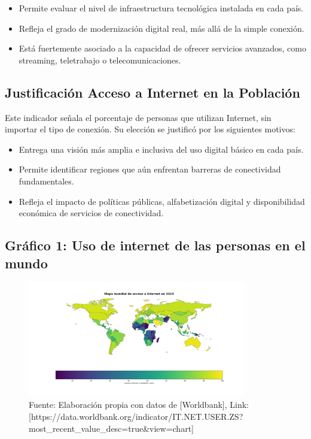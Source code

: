 \documentclass[12pt, a4paper]{article}
\begin{document}
\begin{itemize}
    \item Permite evaluar el nivel de infraestructura tecnológica instalada en cada país.
    \item Refleja el grado de modernización digital real, más allá de la simple conexión.
    \item Está fuertemente asociado a la capacidad de ofrecer servicios avanzados, como streaming, teletrabajo o telecomunicaciones.
\end{itemize}

\subsection{Justificación Acceso a Internet en la Población}

Este indicador señala el porcentaje de personas que utilizan Internet, sin importar el tipo de conexión. Su elección se justificó por los siguientes motivos:

\begin{itemize}
    \item Entrega una visión más amplia e inclusiva del uso digital básico en cada país.
    \item Permite identificar regiones que aún enfrentan barreras de conectividad fundamentales.
    \item Refleja el impacto de políticas públicas, alfabetización digital y disponibilidad económica de servicios de conectividad.
\end{itemize}

\subsection*{Gráfico 1: Uso de internet de las personas en el mundo}
\begin{figure}[H]
    \centering
    \includegraphics[width=0.85\textwidth]{images/Grafico_uso_de_internet_FC.png}
    \caption{Fuente: Elaboración propia con datos de [Worldbank], Link: [https://data.worldbank.org/indicator/IT.NET.USER.ZS?most_recent_value_desc=true&view=chart]}
\end{figure}
\end{document}
